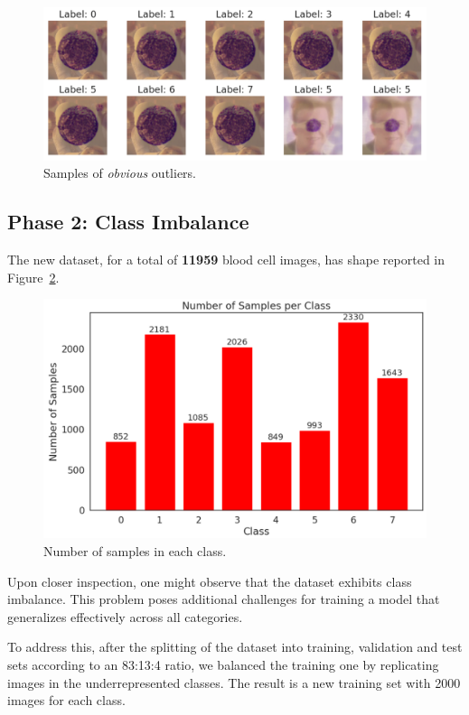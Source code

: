 \documentclass[11pt]{article}
\begin{document}
\begin{multicols*}{2}
        \begin{figure}[H]
            \centering
            \includegraphics[width=\linewidth]{figures/SCR-20241122-oigg.png}
            \caption{Samples of \textit{obvious} outliers.}
            \label{fig:rickroll}
        \end{figure}

        \subsection{Phase 2: Class Imbalance}

        The new dataset, for a total of \textbf{11959} blood cell images, has shape reported in Figure~\ref{fig:imbalance}.

        \begin{figure}[H]
            \centering
            \includegraphics[width=0.75\linewidth]{figures/SCR-20241122-ooty.png}
            \caption{Number of samples in each class.}
            \label{fig:imbalance}
        \end{figure} 

        \noindent Upon closer inspection, one might observe that the dataset exhibits class imbalance. This problem poses additional challenges for training a model that generalizes effectively across all categories.

        To address this, after the splitting of the dataset into training, validation and test sets according to an 83:13:4 ratio, we balanced the training one by replicating images in the underrepresented classes. The result is a new training set with 2000 images for each class.


\end{multicols*}
\end{document}
